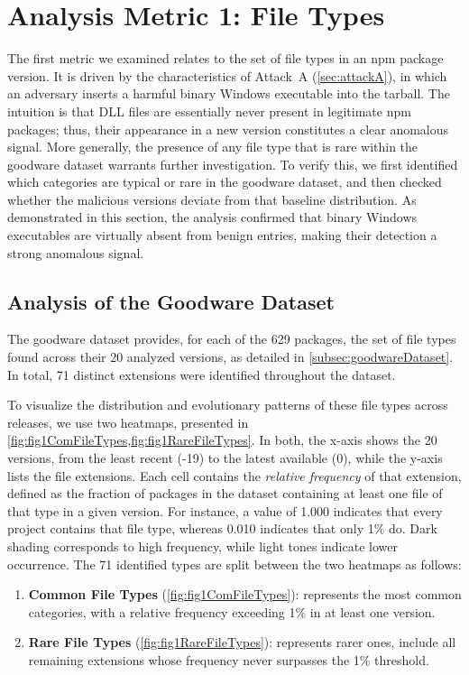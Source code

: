 \section{Analysis Metric 1: File Types}
\label{sec:analysisFileTypes}

The first metric we examined relates to the set of file types in an \ac{npm} package version.
It is driven by the characteristics of Attack~A (\cref{sec:attackA}), 
in which an adversary inserts a harmful binary Windows executable into the tarball.
The intuition is that \ac{DLL} files are essentially never present in legitimate \ac{npm} packages;
thus, their appearance in a new version constitutes a clear anomalous signal.
More generally, the presence of any file type that is rare within the goodware dataset warrants further investigation.
To verify this, we first identified which categories are typical or rare in the goodware dataset,
and then checked whether the malicious versions deviate from that baseline distribution.
As demonstrated in this section, the analysis confirmed that binary Windows executables are virtually absent from benign entries, 
making their detection a strong anomalous signal.

\subsection{Analysis of the Goodware Dataset}
\label{subsec:analysisFileTypesGoodware}

The goodware dataset provides, for each of the 629 packages,
the set of file types found across their 20 analyzed versions, as detailed in \cref{subsec:goodwareDataset}.
In total, 71 distinct extensions were identified throughout the dataset.

To visualize the distribution and evolutionary patterns of these file types across releases,
we use two heatmaps, presented in \cref{fig:fig1ComFileTypes,fig:fig1RareFileTypes}.
In both, the x-axis shows the 20 versions, from the least recent (-19) to the latest available (0), 
while the y-axis lists the file extensions.
Each cell contains the \emph{relative frequency} of that extension,
defined as the fraction of packages in the dataset containing at least one file of that type in a given version.
For instance, a value of 1.000 indicates that every project contains that file type,
whereas 0.010 indicates that only 1\% do.
Dark shading corresponds to high frequency, while light tones indicate lower occurrence.
The 71 identified types are split between the two heatmaps as follows:
\begin{enumerate}
    \item \textbf{Common File Types} (\cref{fig:fig1ComFileTypes}): represents the most common categories, 
    with a relative frequency exceeding 1\% in at least one version. 
    \item \textbf{Rare File Types} (\cref{fig:fig1RareFileTypes}): represents rarer ones, 
    include all remaining extensions whose frequency never surpasses the 1\% threshold.
\end{enumerate}

